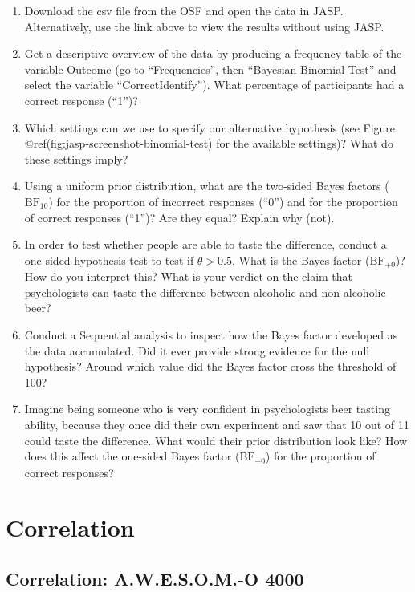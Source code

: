 \documentclass[
  letterpaper,
  DIV=11,
  numbers=noendperiod]{scrreprt}
\providecommand{\tightlist}{%
  \setlength{\itemsep}{0pt}\setlength{\parskip}{0pt}}\usepackage{longtable,booktabs,array}
\begin{document}
\begin{enumerate}
\def\labelenumi{\arabic{enumi}.}
\tightlist
\item
  Download the csv file from the OSF and open the data in JASP.
  Alternatively, use the link above to view the results without using
  JASP.
\item
  Get a descriptive overview of the data by producing a frequency table
  of the variable Outcome (go to ``Frequencies'', then ``Bayesian
  Binomial Test'' and select the variable ``CorrectIdentify''). What
  percentage of participants had a correct response (``1'')?
\item
  Which settings can we use to specify our alternative hypothesis (see
  Figure @ref(fig:jasp-screenshot-binomial-test) for the available
  settings)? What do these settings imply?
\item
  Using a uniform prior distribution, what are the two-sided Bayes
  factors (\(\text{BF}_{10}\)) for the proportion of incorrect responses
  (``0'') and for the proportion of correct responses (``1'')? Are they
  equal? Explain why (not).
\item
  In order to test whether people are able to taste the difference,
  conduct a one-sided hypothesis test to test if \(\theta > 0.5\). What
  is the Bayes factor (\(\text{BF}_{+0}\))? How do you interpret this?
  What is your verdict on the claim that psychologists can taste the
  difference between alcoholic and non-alcoholic beer?
\item
  Conduct a Sequential analysis to inspect how the Bayes factor
  developed as the data accumulated. Did it ever provide strong evidence
  for the null hypothesis? Around which value did the Bayes factor cross
  the threshold of 100?
\item
  Imagine being someone who is very confident in psychologists beer
  tasting ability, because they once did their own experiment and saw
  that 10 out of 11 could taste the difference. What would their prior
  distribution look like? How does this affect the one-sided Bayes
  factor (\(\text{BF}_{+0}\)) for the proportion of correct responses?
\end{enumerate}

\hypertarget{correlation}{%
\section{Correlation}\label{correlation}}

\hypertarget{correlation-a.w.e.s.o.m.-o-4000}{%
\subsection{Correlation: A.W.E.S.O.M.-O
4000}\label{correlation-a.w.e.s.o.m.-o-4000}}
\end{document}
